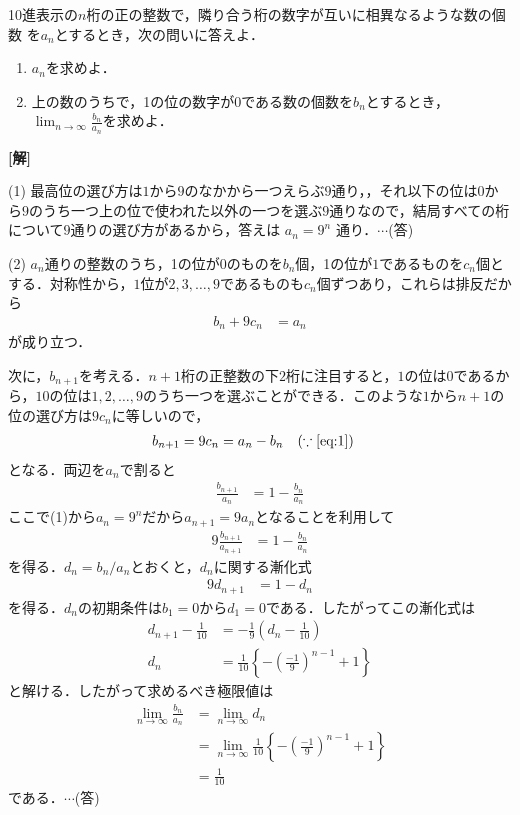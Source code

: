 \documentclass[a4paper,10pt]{ltjsarticle}
\begin{document}
\begin{oframed}
10進表示の$n$桁の正の整数で，隣り合う桁の数字が互いに相異なるような数の個数 を$a_n$とするとき，次の問いに答えよ．
    \begin{enumerate}
        \item $a_n$を求めよ．
        \item 上の数のうちで，1の位の数字が0である数の個数を$b_n$とするとき，$ \displaystyle \lim_{n \to \infty} \frac{b_n}{a_n}$を求めよ．
    \end{enumerate}
\end{oframed}
\setlength{\columnseprule}{0.4pt}
\begin{multicols}{2}
{\bf[解]}

(1) 最高位の選び方は$1$から$9$のなかから一つえらぶ$9$通り，，それ以下の位は$0$から$9$のうち一つ上の位で使われた以外の一つを選ぶ$9$通りなので，結局すべての桁について$9$通りの選び方があるから，答えは $a_n=9^n$ 通り．$\cdots$(答)

\vspace{10pt}
(2)
 $a_n$通りの整数のうち，1の位が$0$のものを$b_n$個，1の位が$1$であるものを$c_n$個とする．対称性から，$1$位が$2,3,\dots,9$であるものも$c_n$個ずつあり，これらは排反だから
    \begin{align}\label{eq:1}
        b_n+9c_n &= a_n  
    \end{align}
が成り立つ．

次に，$b_{n+1}$を考える．$n+1$桁の正整数の下$2$桁に注目すると，$1$の位は$0$であるから，$10$の位は$1,2,\dots,9$のうち一つを選ぶことができる．このような$1$から$n+1$の位の選び方は$9c_n$に等しいので，
    \begin{align*}
        b_{n+1} &= 9c_n = a_n-b_n \quad (\because \text{\cref{eq:1}}) 
    \end{align*}
となる．両辺を$a_n$で割ると
    \begin{align*}
        \frac{b_{n+1}}{a_n} &= 1-\frac{b_n}{a_n} 
    \end{align*}
ここで(1)から$a_n=9^n$だから$a_{n+1}=9 a_{n}$となることを利用して
    \begin{align*}
        9\frac{b_{n+1}}{a_{n+1}} &= 1-\frac{b_n}{a_n} 
    \end{align*}
を得る．$d_n=b_{n}/a_{n}$とおくと，$d_n$に関する漸化式
    \begin{align*}
        9d_{n+1} &= 1-d_n
    \end{align*}
を得る．$d_n$の初期条件は$b_1=0$から$d_1=0$である．したがってこの漸化式は
    \begin{align*}
        d_{n+1}-\frac{1}{10} &= -\frac{1}{9}\left(d_n-\frac{1}{10}\right) \\
        d_n &= \frac{1}{10} \left\{-\left(\frac{-1}{9}\right)^{n-1}+1\right\}
    \end{align*}
と解ける．したがって求めるべき極限値は
    \begin{align*}
        \lim_{n \to \infty} \frac{b_n}{a_n} &= \lim_{n \to \infty} d_n \\
        &= \lim_{n \to \infty} \frac{1}{10}\left\{-\left(\frac{-1}{9}\right)^{n-1}+1\right\} \\
        &= \frac{1}{10}
    \end{align*}
である．$\cdots$(答)


\end{multicols}
\end{document}
